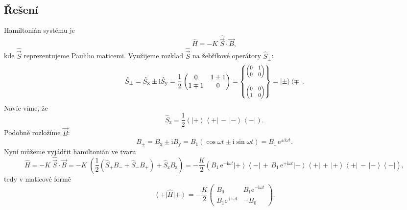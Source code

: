 \documentclass[10pt,a4paper]{article}
\newcommand{\const}[1]{\text{#1}}
\newcommand{\mat}[1]{
    \begin{pmatrix}
        #1
    \end{pmatrix}
}
\newcommand{\smat}[2][1]{
    \scalebox{#1}{$\mat{#2}$}
}
\newcommand{\bra}[1]{\left< #1 \right|}
\newcommand{\ket}[1]{\left| #1 \right>}
\newcommand{\e}[1]{\const{e}^{#1}}
\renewcommand{\i}{\const{i}}
\newcommand{\vechat}[1]{\hat{\vec{#1}}}
\begin{document}
\subsection{Řešení}
Hamiltonián systému je
\begin{equation*}
    \hat H = - K \; \vechat S \cdot \vec B,
\end{equation*}
kde $\vechat S$ reprezentujeme Pauliho maticemi. Využijeme rozklad $\vechat S$ na žebříkové operátory $\hat S_\pm$:
\begin{equation*}
    \hat S_\pm
    = \hat S_\mathrm{x} \pm \i \hat S_\mathrm{y}
    = \frac{1}{2} \mat{ 0 & 1 \pm 1 \\ 1 \mp 1 & 0 }
    = \begin{Bmatrix}
        \smat[0.8]{0 & 1 \\ 0 & 0} \\[15pt]
        \smat[0.8]{0 & 0 \\ 1 & 0}
    \end{Bmatrix}
    = \ket{\pm} \bra{\mp}.
\end{equation*}
Navíc víme, že
\begin{equation*}
    \hat S_\mathrm{z}
    = \frac{1}{2} (\ket{+} \! \bra{+} \, - \, \ket{-} \! \bra{-}).
\end{equation*}
Podobně rozložíme $\vec B$:
\begin{equation*}
    B_\pm
    = B_\mathrm{x} \pm \i B_\mathrm{y}
    = B_1 (\cos \omega t \pm \i \sin \omega t)
    = B_1 \, \e{\pm \i \omega t}.
\end{equation*}
Nyní můžeme vyjádřit hamiltonián ve tvaru
\begin{equation*}
    \hat H
    = -K \; \vechat S \cdot \vec B
    = -K \; \left(
        \frac{1}{2} (\hat S_+ B_- + \hat S_- B_+)
        + \hat S_\mathrm{z} B_\mathrm{z}
    \right)
    = -\frac{K}{2} \left(
        B_1 \, \e{-\i \omega t} \ket{+} \! \bra{-} \, + \,
        B_1 \, \e{+\i \omega t} \ket{-} \! \bra{+} \, + \,
        \ket{+} \! \bra{+} \, - \, \ket{-} \! \bra{-}
    \right),
\end{equation*}
tedy v maticové formě
\begin{equation*}
    \bra{\pm} \hat H \ket{\pm} =
    -\frac{K}{2} \mat{
        B_0 & B_1 \e{-\i \omega t}  \\
        B_1 \e{+\i \omega t} & -B_0
    }.
\end{equation*}

\bigskip
\end{document}

